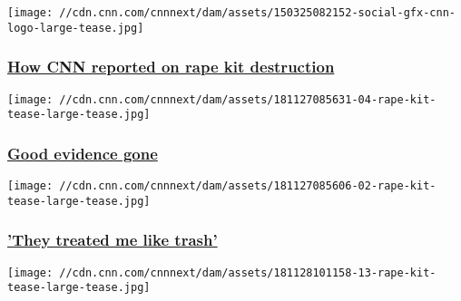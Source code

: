 \href{https://www.cnn.com/interactive/2018/11/investigates/police-destroyed-rapekits/about.html}{}

\texttt{[image: //cdn.cnn.com/cnnnext/dam/assets/150325082152-social-gfx-cnn-logo-large-tease.jpg]}

\hypertarget{how-cnn-reported-on-rape-kit-destruction}{%
\subsubsection{\texorpdfstring{\href{https://www.cnn.com/interactive/2018/11/investigates/police-destroyed-rapekits/about.html}{How
CNN reported on rape kit
destruction}}{How CNN reported on rape kit destruction}}\label{how-cnn-reported-on-rape-kit-destruction}}

\href{https://www.cnn.com/interactive/2018/11/investigates/police-destroyed-rapekits/good-evidence-gone.html}{}

\texttt{[image: //cdn.cnn.com/cnnnext/dam/assets/181127085631-04-rape-kit-tease-large-tease.jpg]}

\hypertarget{good-evidence-gone}{%
\subsubsection{\texorpdfstring{\href{https://www.cnn.com/interactive/2018/11/investigates/police-destroyed-rapekits/good-evidence-gone.html}{Good
evidence gone}}{Good evidence gone}}\label{good-evidence-gone}}

\href{https://www.cnn.com/interactive/2018/11/investigates/police-destroyed-rapekits/treated-me-like-trash.html}{}

\texttt{[image: //cdn.cnn.com/cnnnext/dam/assets/181127085606-02-rape-kit-tease-large-tease.jpg]}

\hypertarget{they-treated-me-like-trash}{%
\subsubsection{\texorpdfstring{\href{https://www.cnn.com/interactive/2018/11/investigates/police-destroyed-rapekits/treated-me-like-trash.html}{'They
treated me like
trash'}}{'They treated me like trash'}}\label{they-treated-me-like-trash}}

\href{https://www.cnn.com/interactive/2018/11/investigates/police-destroyed-rapekits/springfield.html}{}

\texttt{[image: //cdn.cnn.com/cnnnext/dam/assets/181128101158-13-rape-kit-tease-large-tease.jpg]}

